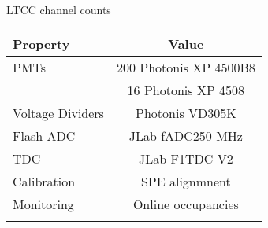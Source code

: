 \begin{center}
	LTCC channel counts \\
	\begin{tabular}{| l | c |}
		\hline \hline
		Property                 & Value \\
		\hline
		PMTs             & 200 Photonis XP 4500B8    \\
                       & 16 Photonis XP 4508       \\
		Voltage Dividers & Photonis VD305K           \\
		Flash ADC        & JLab fADC250-MHz          \\
		TDC              & JLab F1TDC V2             \\
		Calibration      & SPE alignmnent            \\
		Monitoring       & Online occupancies        \\
		\hline \hline
		\label{tab:channels}
	\end{tabular}
\end{center}

